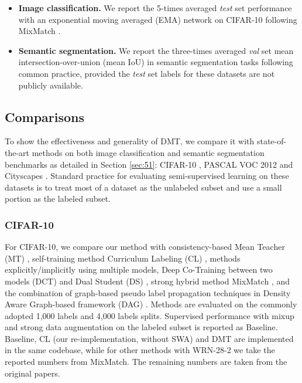 \documentclass[preprint,review,10pt]{elsarticle}
\begin{document}
\begin{itemize}
    \item \textbf{Image classification.} We report the 5-times averaged \textit{test} set performance with an exponential moving averaged (EMA) network on CIFAR-10 following MixMatch \cite{berthelot2019mixmatch}.
    \item \textbf{Semantic segmentation.} We report the three-times averaged \textit{val} set mean intersection-over-union (mean IoU) in semantic segmentation tasks following common practice, provided the \textit{test} set labels for these datasets are not publicly available.
\end{itemize}





\subsection{Comparisons}
\label{sec:53}
To show the effectiveness and generality of DMT, we compare it with state-of-the-art methods on both image classification and semantic segmentation benchmarks as detailed in Section \ref{sec:51}: CIFAR-10 \cite{krizhevsky2009learning}, PASCAL VOC 2012 \cite{everingham2015pascal} and Cityscapes \cite{cordts2016cityscapes}. Standard practice for evaluating semi-supervised learning on these datasets is to treat most of a dataset as the unlabeled subset and use a small portion as the labeled subset.


\subsubsection{CIFAR-10}
\label{sec:531}

For CIFAR-10, we compare our method with consistency-based Mean Teacher (MT) \cite{tarvainen2017mean}, self-training method Curriculum Labeling (CL) \cite{cascante2020curriculum}, methods explicitly/implicitly using multiple models, Deep Co-Training between two models (DCT) \cite{qiao2018deep} and Dual Student (DS) \cite{ke2019dual}, strong hybrid method MixMatch \cite{berthelot2019mixmatch}, and the combination of graph-based pseudo label propagation techniques in Density Aware Graph-based framework (DAG) \cite{li2020density}. Methods are evaluated on the commonly adopted 1,000 labels and 4,000 labels splits. Supervised performance with mixup and strong data augmentation on the labeled subset is reported as Baseline. Baseline, CL (our re-implementation, without SWA) and DMT are implemented in the same codebase, while for other methods with WRN-28-2 we take the reported numbers from MixMatch. The remaining numbers are taken from the original papers.
\end{document}
